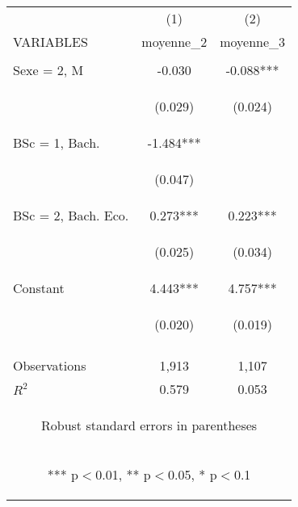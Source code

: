 \begin{center}
\begin{tabular}{lcc} \hline
 & (1) & (2) \\
VARIABLES & moyenne\_2 & moyenne\_3 \\ \hline
\vspace{4pt} & \begin{footnotesize}\end{footnotesize} & \begin{footnotesize}\end{footnotesize} \\
Sexe = 2, M & -0.030 & -0.088*** \\
\vspace{4pt} & \begin{footnotesize}(0.029)\end{footnotesize} & \begin{footnotesize}(0.024)\end{footnotesize} \\
BSc = 1, Bach. & -1.484*** &  \\
\vspace{4pt} & \begin{footnotesize}(0.047)\end{footnotesize} & \begin{footnotesize}\end{footnotesize} \\
BSc = 2, Bach. Eco. & 0.273*** & 0.223*** \\
\vspace{4pt} & \begin{footnotesize}(0.025)\end{footnotesize} & \begin{footnotesize}(0.034)\end{footnotesize} \\
Constant & 4.443*** & 4.757*** \\
 & \begin{footnotesize}(0.020)\end{footnotesize} & \begin{footnotesize}(0.019)\end{footnotesize} \\
\vspace{4pt} & \begin{footnotesize}\end{footnotesize} & \begin{footnotesize}\end{footnotesize} \\
Observations & 1,913 & 1,107 \\
 $R^2$ & 0.579 & 0.053 \\ \hline
\multicolumn{3}{c}{\begin{footnotesize} Robust standard errors in parentheses\end{footnotesize}} \\
\multicolumn{3}{c}{\begin{footnotesize} *** p$<$0.01, ** p$<$0.05, * p$<$0.1\end{footnotesize}} \\
\end{tabular}
\end{center}
